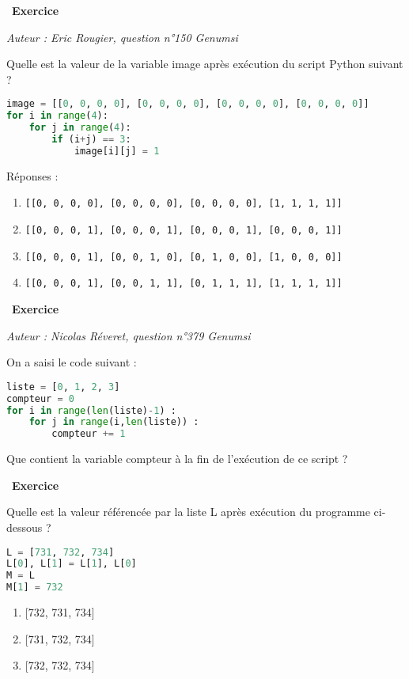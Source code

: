 \documentclass[
  11pt,
]{article}
\newcommand{\passthrough}[1]{#1}
\providecommand{\tightlist}{%
  \setlength{\itemsep}{0pt}\setlength{\parskip}{0pt}}
\newcounter{exo}
\newenvironment{exercice}[1]
{\par \medskip   \addtocounter{exo}{1} \noindent  
\begin{bclogo}[arrondi =0.1,   noborder = true, logo=\bccrayon, marge=4]{~\textbf{Exercice} \textbf{\theexo} {\itshape #1} }  \par}
{
\end{bclogo}
 \par \bigskip }
\newcounter{def}
\newcounter{prog}
\begin{document}
\begin{exercice}{}

\emph{Auteur : Eric Rougier, question n°150 Genumsi}

Quelle est la valeur de la variable image après exécution du script
Python suivant ?

\begin{lstlisting}[language=Python]
image = [[0, 0, 0, 0], [0, 0, 0, 0], [0, 0, 0, 0], [0, 0, 0, 0]]
for i in range(4):
    for j in range(4):
        if (i+j) == 3:
            image[i][j] = 1
\end{lstlisting}

Réponses :

\begin{enumerate}
\def\labelenumi{\arabic{enumi}.}
\item
  \passthrough{\lstinline![[0, 0, 0, 0], [0, 0, 0, 0], [0, 0, 0, 0], [1, 1, 1, 1]]!}
\item
  \passthrough{\lstinline![[0, 0, 0, 1], [0, 0, 0, 1], [0, 0, 0, 1], [0, 0, 0, 1]]!}
\item
  \passthrough{\lstinline![[0, 0, 0, 1], [0, 0, 1, 0], [0, 1, 0, 0], [1, 0, 0, 0]]!}
\item
  \passthrough{\lstinline![[0, 0, 0, 1], [0, 0, 1, 1], [0, 1, 1, 1], [1, 1, 1, 1]]!}
\end{enumerate}

\end{exercice}

\begin{exercice}{}

\emph{Auteur : Nicolas Réveret, question n°379 Genumsi}

On a saisi le code suivant :

\begin{lstlisting}[language=Python]
liste = [0, 1, 2, 3]
compteur = 0
for i in range(len(liste)-1) :
    for j in range(i,len(liste)) :
        compteur += 1
\end{lstlisting}

Que contient la variable compteur à la fin de l'exécution de ce script ?

\end{exercice}

\begin{exercice}{}

Quelle est la valeur référencée par la liste L après exécution du
programme ci-dessous ?

\begin{lstlisting}[language=Python]
L = [731, 732, 734]
L[0], L[1] = L[1], L[0]
M = L
M[1] = 732
\end{lstlisting}

\begin{enumerate}
\def\labelenumi{\arabic{enumi}.}
\tightlist
\item
  {[}732, 731, 734{]}
\item
  {[}731, 732, 734{]}
\item
  {[}732, 732, 734{]}
\end{enumerate}

\end{exercice}
\end{document}
